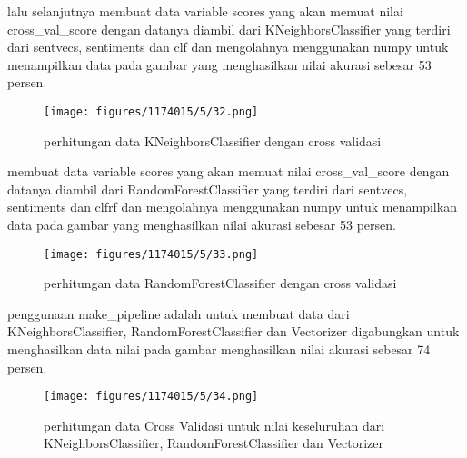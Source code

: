\begin{enumerate}
        \subitem lalu selanjutnya membuat data variable scores yang akan memuat nilai cross\_val\_score dengan datanya diambil dari KNeighborsClassifier yang terdiri dari sentvecs, sentiments dan clf dan mengolahnya menggunakan numpy untuk menampilkan data pada gambar yang menghasilkan nilai akurasi sebesar 53 persen.
        \begin{figure}[H]
            \texttt{[image: figures/1174015/5/32.png]}
            \centering
            \caption{perhitungan data KNeighborsClassifier dengan cross validasi}
        \end{figure}
        
        \subitem membuat data variable scores yang akan memuat nilai cross\_val\_score dengan datanya diambil dari RandomForestClassifier yang terdiri dari sentvecs, sentiments dan clfrf dan mengolahnya menggunakan numpy untuk menampilkan data pada gambar yang menghasilkan nilai akurasi sebesar 53 persen. 
        \begin{figure}[H]
            \texttt{[image: figures/1174015/5/33.png]}
            \centering
            \caption{perhitungan data  RandomForestClassifier dengan cross validasi}
        \end{figure}
        
        \subitem penggunaan make\_pipeline adalah untuk membuat data dari KNeighborsClassifier, RandomForestClassifier dan Vectorizer digabungkan untuk menghasilkan data nilai pada gambar menghasilkan nilai akurasi sebesar 74 persen. 
        \begin{figure}[H]
            \texttt{[image: figures/1174015/5/34.png]}
            \centering
            \caption{perhitungan data Cross Validasi untuk nilai keseluruhan dari KNeighborsClassifier, RandomForestClassifier dan Vectorizer}
        \end{figure}
        
        \end{enumerate}